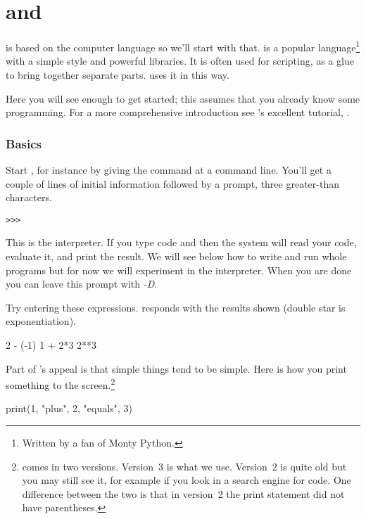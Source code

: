 \chapter{\python{} and \Sage{}}

\Sage{} is based on the computer language \python{} so we'll start with that.
\python{} is a popular language\footnote{Written by a fan of
Monty Python.} 
with a simple style and powerful libraries.
It is often used for scripting, as a glue to bring together separate parts.
\Sage{} uses it in this way.

Here you will see enough \python{} to get started; this assumes 
that you already know some programming.
For a more comprehensive introduction see \python's excellent tutorial,
\cite{PythonTeam19b}.



\subsection{Basics}
Start \python, for instance by giving the command
at a command line.
You'll get a couple of lines of initial
information followed by a prompt, three greater-than
characters.
\begin{lstlisting}[style=python]
>>>   
\end{lstlisting}
This is the \python{} interpreter.
If you type 
\python{} code and  then the system
will read your code, evaluate it, and print the result.
We will see below how to write and run whole programs
but for now we will experiment in the interpreter.
When you are done you can 
leave this prompt with \textit{-D}.

Try entering these expressions.
\python{} responds with the results shown
(double star is exponentiation).
\begin{pythonconsole}
2 - (-1)
1 + 2*3
2**3  
\end{pythonconsole}

Part of \python's appeal is that simple things tend to be simple.
Here is how you print something to the screen.\footnote{%
  \protect\python{} comes in two versions.
  Version~3 is what we use.
  Version~2 is quite old but you may still see it, for example if
  you look in a search engine for code.
  One difference between the two is that in version~2 the
  print statement did not have parentheses.}
\begin{pythonconsole}
print(1, "plus", 2, "equals", 3)
\end{pythonconsole}

